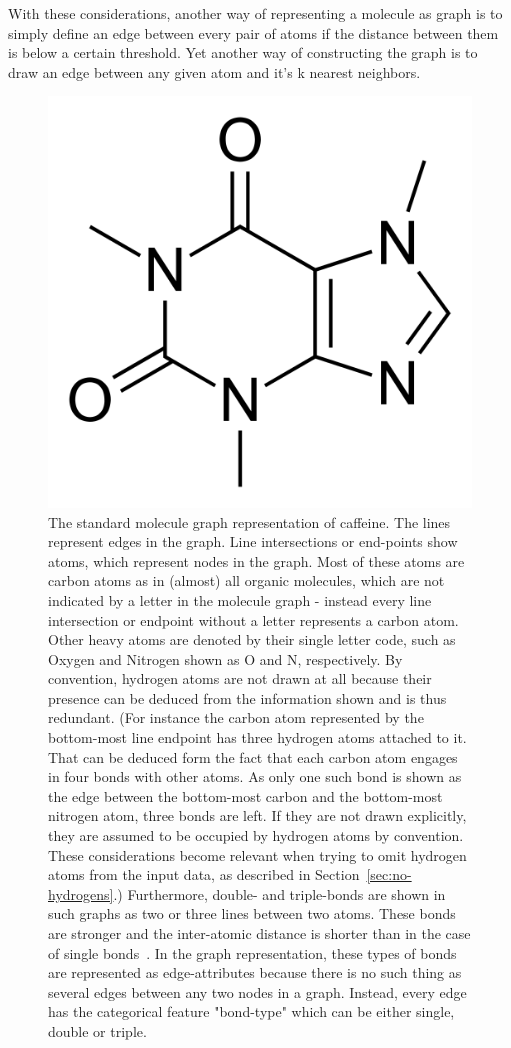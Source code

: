 With these considerations, another way of representing a molecule as graph is to simply define an edge between every pair of atoms if the distance between them is below a certain threshold. Yet another way of constructing the graph is to draw an edge between any given atom and it's k nearest neighbors.


\begin{figure}[H]
	\centering
	\includegraphics[width=0.6\linewidth]{figures/caffeine}
	\caption{The standard molecule graph representation of caffeine. The lines represent edges in the graph. Line intersections or end-points show atoms, which represent nodes in the graph. Most of these atoms are carbon atoms as in (almost) all organic molecules, which are not indicated by a letter in the molecule graph - instead every line intersection or endpoint without a letter represents a carbon atom. Other heavy atoms are denoted by their single letter code, such as Oxygen and Nitrogen shown as O and N, respectively.
	By convention, hydrogen atoms are not drawn at all because their presence can be deduced from the information shown and is thus redundant. (For instance the carbon atom represented by the bottom-most line endpoint has three hydrogen atoms attached to it. That can be deduced form the fact that each carbon atom engages in four bonds with other atoms. As only one such bond is shown as the edge between the bottom-most carbon and the bottom-most nitrogen atom, three bonds are left. If they are not drawn explicitly, they are assumed to be occupied by hydrogen atoms by convention. These considerations become relevant when trying to omit hydrogen atoms from the input data, as described in Section~\ref{sec:no-hydrogens}.)
	Furthermore, double- and triple-bonds are shown in such graphs as two or three lines between two atoms. These bonds are stronger and the inter-atomic distance is shorter than in the case of single bonds~\cite{Organic-chemistry}. In the graph representation, these types of bonds are represented as edge-attributes because there is no such thing as several edges between any two nodes in a graph. Instead, every edge has the categorical feature "bond-type" which can be either single, double or triple.
	}
	\label{fig:caffeine}
\end{figure}


